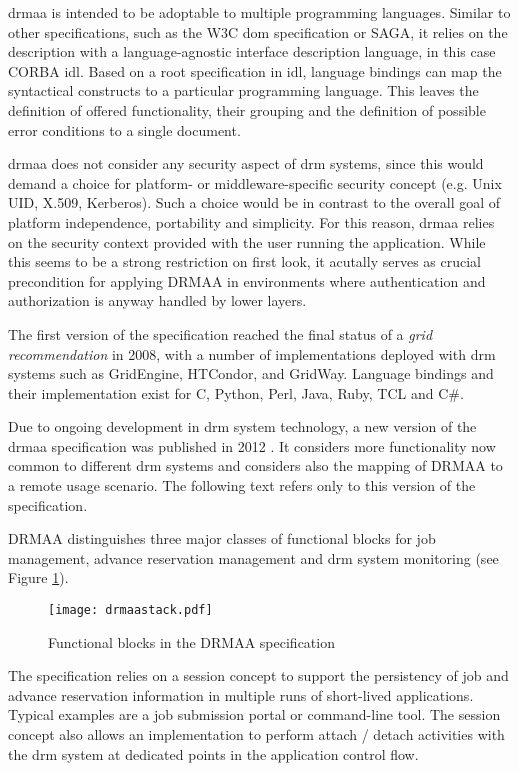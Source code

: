 \documentclass[twocolumn]{svjour3}       %
\begin{document}
\gls{drmaa} is intended to be adoptable to multiple programming languages. Similar to other specifications, such as the W3C \gls{dom} specification or SAGA, it relies on the description with a language-agnostic interface description language, in this case CORBA \gls{idl}. Based on a root specification in \gls{idl}, language bindings can map the syntactical constructs to a particular programming language. This leaves the definition of offered functionality, their grouping and the definition of possible error conditions to a single document.

\gls{drmaa} does not consider any security aspect of \gls{drm} systems, since this would demand a choice for platform- or middleware-specific security concept (e.g. Unix UID, X.509, Kerberos). Such a choice would be in contrast to the overall goal of platform independence, portability and simplicity. For this reason, \gls{drmaa} relies on the security context provided with the user running the application. While this seems to be a strong restriction on first look, it acutally serves as crucial precondition for applying DRMAA in environments where authentication and authorization is anyway handled by lower layers. 

The first version of the specification reached the final status of a \emph{grid recommendation} in 2008, with a number of implementations deployed with \gls{drm} systems such as GridEngine, HTCondor, and GridWay. Language bindings and their implementation exist for C, Python, Perl, Java, Ruby, TCL and C\#. 

Due to ongoing development in \gls{drm} system technology, a new version of the \gls{drmaa} specification was published in 2012 \cite{citemaster_9274}. It considers more functionality now common to different \gls{drm} systems and considers also the mapping of DRMAA to a remote usage scenario. The following text refers only to this version of the specification.

DRMAA distinguishes three major classes of functional blocks for job management, advance reservation management and \gls{drm} system monitoring (see Figure \ref{fig:drmaastack}).

\begin{figure}
  \texttt{[image: drmaastack.pdf]}
\caption{Functional blocks in the DRMAA specification}
\label{fig:drmaastack} 
\end{figure}

The specification relies on a session concept to support the persistency of job and advance reservation information in multiple runs of short-lived applications. Typical examples are a job submission portal or command-line tool. The session concept also allows an implementation to perform attach / detach activities with the \gls{drm} system at dedicated points in the application control flow.
\end{document}
